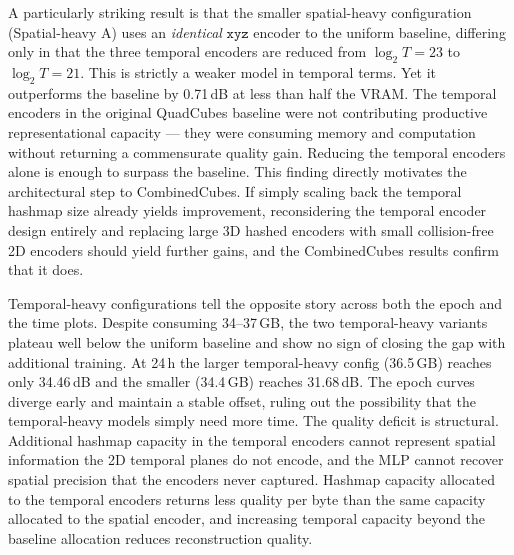 \documentclass[12pt, a4paper, twoside]{report}
\begin{document}
A particularly striking result is that the smaller spatial-heavy configuration (Spatial-heavy A) uses an \emph{identical} $\texttt{xyz}$ encoder to the uniform baseline, differing only in that the three temporal encoders are reduced from $\log_2 T = 23$ to $\log_2 T = 21$. This is strictly a weaker model in temporal terms. Yet it outperforms the baseline by 0.71\,dB at less than half the VRAM. The temporal encoders in the original QuadCubes baseline were not contributing productive representational capacity — they were consuming memory and computation without returning a commensurate quality gain. Reducing the temporal encoders alone is enough to surpass the baseline. This finding directly motivates the architectural step to CombinedCubes. If simply scaling back the temporal hashmap size already yields improvement, reconsidering the temporal encoder design entirely and replacing large 3D hashed encoders with small collision-free 2D encoders should yield further gains, and the CombinedCubes results confirm that it does.

Temporal-heavy configurations tell the opposite story across both the epoch and the time plots. Despite consuming 34--37\,GB, the two temporal-heavy variants plateau well below the uniform baseline and show no sign of closing the gap with additional training. At 24\,h the larger temporal-heavy config (36.5\,GB) reaches only 34.46\,dB and the smaller (34.4\,GB) reaches 31.68\,dB. The epoch curves diverge early and maintain a stable offset, ruling out the possibility that the temporal-heavy models simply need more time. The quality deficit is structural. Additional hashmap capacity in the temporal encoders cannot represent spatial information the 2D temporal planes do not encode, and the MLP cannot recover spatial precision that the encoders never captured. Hashmap capacity allocated to the temporal encoders returns less quality per byte than the same capacity allocated to the spatial encoder, and increasing temporal capacity beyond the baseline allocation reduces reconstruction quality.
\end{document}
